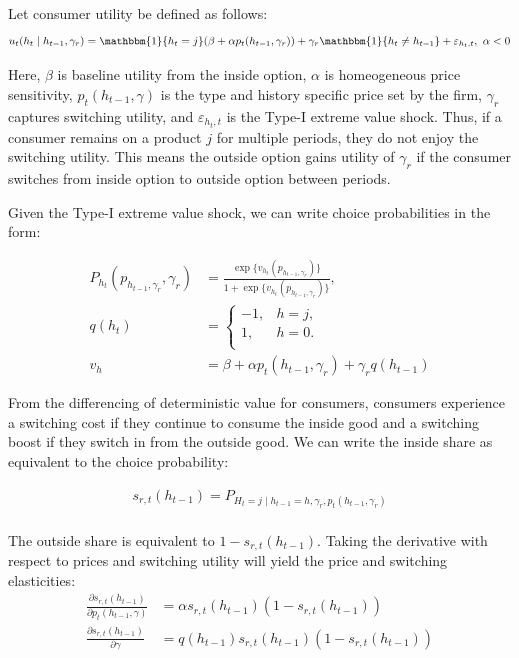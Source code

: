 \documentclass[12pt]{article}
\theoremstyle{definition}
\theoremstyle{remark}
\begin{document}
Let consumer utility be defined as follows:
\begin{equation}
  u_t(h_t\mid h_{t-1},\gamma_r) = \mathbbm{1}\{h_t=j\}(\beta+\alpha p_t(h_{t-1}, \gamma_r)) + \gamma_r\mathbbm{1}\{h_t\ne h_{t-1}\} + \varepsilon_{h_t, t}, \ \alpha < 0
\end{equation}
  
Here, $\beta$ is baseline utility from the inside option, $\alpha$ is homeogeneous price sensitivity, $p_t(h_{t-1}, \gamma)$ is the type and history specific price set by the firm, $\gamma_r$ captures switching utility, and $\varepsilon_{h_t, t}$ is the Type-I extreme value shock. Thus, if a consumer remains on a product $j$ for multiple periods, they do not enjoy the switching utility. This means the outside option gains utility of $\gamma_r$ if the consumer switches from inside option to outside option between periods. 

Given the Type-I extreme value shock, we can write choice probabilities in the form:

\begin{align}
  P_{h_t}(p_{h_{t-1}, \gamma_r}, \gamma_r) &= \frac{\exp\{v_{h_t}(p_{h_{t-1}, \gamma_r})\}}{1 + \exp\{v_{h_t}(p_{h_{t-1}, \gamma_r})\}}, \\
  q(h_t) &= 
  \begin{cases}
    -1, & h=j,\\
    1, & h=0.\\
  \end{cases}
   \\ v_h &= \beta + \alpha p_t(h_{t-1}, \gamma_r)+\gamma_rq(h_{t-1})
\end{align}

From the differencing of deterministic value for consumers, consumers experience a switching cost if they continue to consume the inside good and a switching boost if they switch in from the outside good. We can write the inside share as equivalent to the choice probability:

\begin{align*}
  s_{r, t}(h_{t-1}) = P_{H_t=j\mid h_{t-1}=h, \gamma_r, p_t(h_{t-1}, \gamma_r)} \\
\end{align*}

The outside share is equivalent to $1 - s_{r,t}(h_{t-1})$. Taking the derivative with respect to prices and switching utility will yield the price and switching elasticities:
\begin{align*}
  \frac{\partial s_{r, t}(h_{t-1})}{\partial p_t(h_{t-1}, \gamma)} &= \alpha s_{r,t}(h_{t-1})(1-s_{r,t}(h_{t-1})) \\
  \frac{\partial s_{r,t}(h_{t-1})}{\partial\gamma} &= q(h_{t-1})s_{r,t}(h_{t-1})(1-s_{r,t}(h_{t-1}))
\end{align*}
\end{document}
